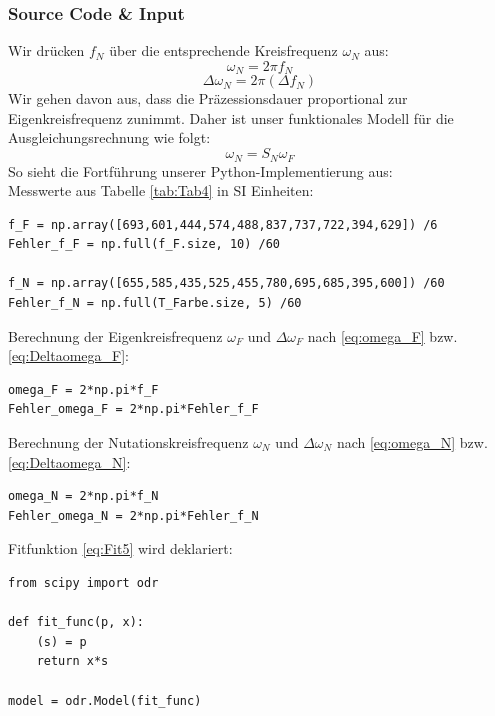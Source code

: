 \documentclass[a4paper,10pt]{article}
\begin{document}
\subsubsection{Source Code \& Input}
Wir drücken \(f_N\) über die entsprechende Kreisfrequenz \(\omega_{N}\) aus:
\begin{equation} \label{eq:omega_N}
	\omega_{N}=2\pi f_{N}
\end{equation} 
\begin{equation} \label{eq:Deltaomega_N}
	\Delta\omega_{N}=2\pi (\Delta f_{N})
\end{equation} 
Wir gehen davon aus, dass die Präzessionsdauer proportional zur Eigenkreisfrequenz zunimmt.
Daher ist unser funktionales Modell für die Ausgleichungsrechnung wie folgt:
\begin{equation} \label{eq:Fit5}
	\boxed{\omega_{N} = {S_N} \omega_{F}}
\end{equation} 
So sieht die Fortführung unserer Python-Implementierung aus:\\
Messwerte aus Tabelle \ref{tab:Tab4} in SI Einheiten:
\begin{lstlisting}
f_F = np.array([693,601,444,574,488,837,737,722,394,629]) /6
Fehler_f_F = np.full(f_F.size, 10) /60

f_N = np.array([655,585,435,525,455,780,695,685,395,600]) /60 
Fehler_f_N = np.full(T_Farbe.size, 5) /60

\end{lstlisting}

Berechnung der Eigenkreisfrequenz  \(\omega_F\) und \(\Delta\omega_F\) nach \eqref{eq:omega_F} bzw. \eqref{eq:Deltaomega_F}:\begin{lstlisting}
omega_F = 2*np.pi*f_F 
Fehler_omega_F = 2*np.pi*Fehler_f_F

\end{lstlisting}

Berechnung der Nutationskreisfrequenz  \(\omega_N\) und \(\Delta\omega_N\) nach \eqref{eq:omega_N} bzw. \eqref{eq:Deltaomega_N}:\begin{lstlisting}
omega_N = 2*np.pi*f_N
Fehler_omega_N = 2*np.pi*Fehler_f_N

\end{lstlisting}

Fitfunktion \eqref{eq:Fit5} wird deklariert:\begin{lstlisting}
from scipy import odr

def fit_func(p, x):
    (s) = p
    return x*s

model = odr.Model(fit_func)

\end{lstlisting}
\end{document}
